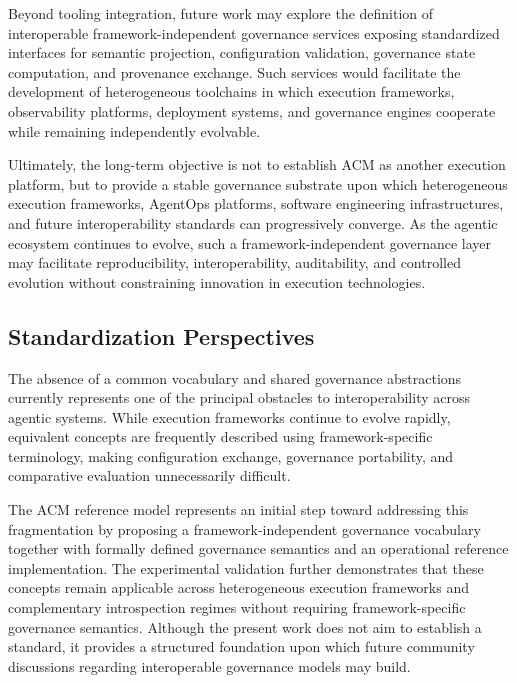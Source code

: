 \documentclass[10pt]{article}
\begin{document}
Beyond tooling integration, future work may explore the definition of interoperable framework-independent governance services exposing standardized interfaces for semantic projection, configuration validation, governance state computation, and provenance exchange. Such services would facilitate the development of heterogeneous toolchains in which execution frameworks, observability platforms, deployment systems, and governance engines cooperate while remaining independently evolvable.

Ultimately, the long-term objective is not to establish ACM as another execution platform, but to provide a stable governance substrate upon which heterogeneous execution frameworks, AgentOps platforms, software engineering infrastructures, and future interoperability standards can progressively converge. As the agentic ecosystem continues to evolve, such a framework-independent governance layer may facilitate reproducibility, interoperability, auditability, and controlled evolution without constraining innovation in execution technologies.

\subsection{Standardization Perspectives}
\label{sec:future_standardization}

The absence of a common vocabulary and shared governance abstractions currently represents one of the principal obstacles to interoperability across agentic systems. While execution frameworks continue to evolve rapidly, equivalent concepts are frequently described using framework-specific terminology, making configuration exchange, governance portability, and comparative evaluation unnecessarily difficult.

The ACM reference model represents an initial step toward addressing this fragmentation by proposing a framework-independent governance vocabulary together with formally defined governance semantics and an operational reference implementation. The experimental validation further demonstrates that these concepts remain applicable across heterogeneous execution frameworks and complementary introspection regimes without requiring framework-specific governance semantics. Although the present work does not aim to establish a standard, it provides a structured foundation upon which future community discussions regarding interoperable governance models may build.
\end{document}
